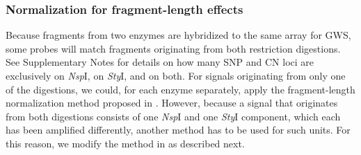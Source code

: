 \documentclass{bioinfo}
\newcommand{\GWS}{GWS\xspace}
\newcommand{\GWSSix}{GWS6\xspace}
\newcommand{\NspI}{\emph{Nsp}I\xspace}
\newcommand{\StyI}{\emph{Sty}I\xspace}
\begin{document}
\subsubsection{Normalization for fragment-length effects}
\label{secFLnorm}
Because fragments from two enzymes are hybridized to the same array for \GWS, some probes will match fragments originating from both restriction digestions.  See Supplementary Notes for details on how many SNP and CN loci are exclusively on \NspI, on \StyI, and on both.
For signals originating from only one of the digestions, we could, for each enzyme separately, apply the fragment-length normalization method proposed in \citet{BengtssonH_etal_2008}.  However, because a signal that originates from both digestions consists of one \NspI and one \StyI component, which each has been amplified differently, another method has to be used for such units.  For this reason, we modify the method in \citet{BengtssonH_etal_2008} as described next. 
\end{document}
